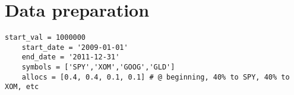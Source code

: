 \chapter{Data preparation}

\begin{lstlisting}[style=python]
	start_val = 1000000
	start_date = '2009-01-01'
	end_date = '2011-12-31'
	symbols = ['SPY','XOM','GOOG','GLD']
	allocs = [0.4, 0.4, 0.1, 0.1] # @ beginning, 40% to SPY, 40% to XOM, etc
\end{lstlisting}